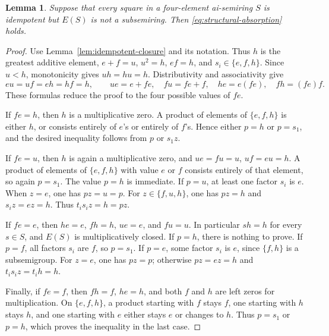\documentclass[11pt,reqno]{amsart}
\newtheorem{lemma}[theorem]{Lemma}
\theoremstyle{remark}
\numberwithin{equation}{section}
\begin{document}
\begin{lemma}\label{lem:exceptional-idempotents-absorption}
Suppose that every square in a four-element ai-semiring $S$ is
idempotent but $E(S)$ is not a subsemiring. Then
\eqref{eq:structural-absorption} holds.
\end{lemma}
\begin{proof}
Use Lemma~\ref{lem:idempotent-closure} and its notation. Thus $h$ is
the greatest additive element, $e+f=u$, $u^2=h$, $ef=h$, and
$s_i\in\{e,f,h\}$. Since $u<h$, monotonicity gives $uh=hu=h$.
Distributivity and associativity give
\begin{equation}\label{eq:four-forms}
eu=uf=eh=hf=h,\qquad
ue=e+fe,\quad fu=fe+f,\quad he=e(fe),\quad fh=(fe)f.
\end{equation}
These formulas reduce the proof to the four possible values of $fe$.

If $fe=h$, then $h$ is a multiplicative zero. A product of elements
of $\{e,f,h\}$ is either $h$, or consists entirely of $e$'s or entirely
of $f$'s. Hence either $p=h$ or $p=s_1$, and the desired inequality
follows from $p$ or $s_1z$.

If $fe=u$, then $h$ is again a multiplicative zero, and
$ue=fu=u$, $uf=eu=h$. A product of elements of $\{e,f,h\}$ with
value $e$ or $f$ consists entirely of that element, so again
$p=s_1$. The value $p=h$ is immediate. If $p=u$, at least one factor
$s_i$ is $e$. When $z=e$, one has $pz=u=p$.
For $z\in\{f,u,h\}$, one has $pz=h$ and $s_i z=ez=h$.
Thus $t_i s_i z=h=pz$.

If $fe=e$, then $he=e$, $fh=h$, $ue=e$, and $fu=u$.
In particular $sh=h$ for every $s\in S$, and $E(S)$ is
multiplicatively closed. If $p=h$, there is nothing to prove.
If $p=f$, all factors $s_i$ are $f$, so $p=s_1$.
If $p=e$, some factor $s_i$ is $e$, since $\{f,h\}$ is a subsemigroup.
For $z=e$, one has $pz=p$; otherwise $pz=ez=h$ and
$t_i s_i z=t_i h=h$.

Finally, if $fe=f$, then $fh=f$, $he=h$, and both $f$ and $h$
are left zeros for multiplication. On $\{e,f,h\}$, a product starting
with $f$ stays $f$, one starting with $h$ stays $h$, and one starting
with $e$ either stays $e$ or changes to $h$. Thus $p=s_1$ or $p=h$,
which proves the inequality in the last case.
\end{proof}
\end{document}
